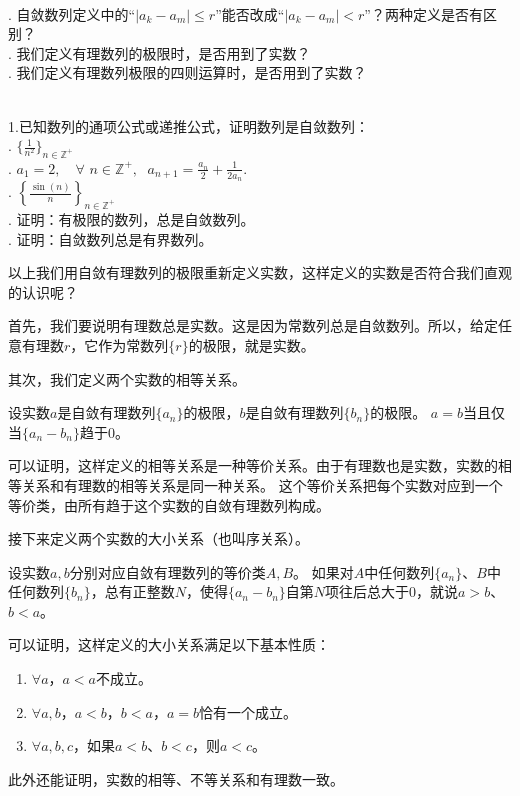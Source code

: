 \documentclass[12pt,UTF8]{ctexbook}
\begin{document}
\begin{sk}
    \mbox{}\\
    . 自敛数列定义中的“$|a_k -a_m| \leqslant r$”能否改成“$|a_k -a_m| < r$”？两种定义是否有区别？\\
    . 我们定义有理数列的极限时，是否用到了实数？\\
    . 我们定义有理数列极限的四则运算时，是否用到了实数？
\end{sk}
\begin{xt}
    \mbox{}\\
    \indent 1.已知数列的通项公式或递推公式，证明数列是自敛数列：\\
    . $\{\frac{1}{n^2}\}_{n\in\mathbb{Z}^+}$\\
    . $a_1 = 2, \quad \forall \,\, n\in\mathbb{Z}^+, \;\,\, a_{n+1} = \frac{a_n}{2} + \frac{1}{2a_n}.$\\
    . $\left\{\frac{\sin(n)}{n}\right\}_{n\in\mathbb{Z}^+}$ \\
    . 证明：有极限的数列，总是自敛数列。\\
    . 证明：自敛数列总是有界数列。
\end{xt}

以上我们用自敛有理数列的极限重新定义实数，这样定义的实数是否符合我们直观的认识呢？

首先，我们要说明有理数总是实数。这是因为常数列总是自敛数列。所以，给定任意有理数$r$，它作为常数列$\{r\}$的极限，就是实数。

其次，我们定义两个实数的相等关系。
\begin{df}
    设实数$a$是自敛有理数列$\{a_n\}$的极限，$b$是自敛有理数列$\{b_n\}$的极限。
    $a = b$当且仅当$\{a_n - b_n\}$趋于$0$。
\end{df}
可以证明，这样定义的相等关系是一种等价关系。由于有理数也是实数，实数的相等关系和有理数的相等关系是同一种关系。
这个等价关系把每个实数对应到一个等价类，由所有趋于这个实数的自敛有理数列构成。

接下来定义两个实数的大小关系（也叫序关系）。
\begin{df}
    设实数$a,b$分别对应自敛有理数列的等价类$A,B$。
    如果对$A$中任何数列$\{a_n\}$、$B$中任何数列$\{b_n\}$，总有正整数$N$，使得$\{a_n - b_n\}$自第$N$项往后总大于$0$，就说$a>b$、$b<a$。
\end{df}
可以证明，这样定义的大小关系满足以下基本性质：
\begin{enumerate}
    \item $\forall a$，$a < a$不成立。
    \item $\forall a, b$，$a < b$，$b <a$，$a = b$恰有一个成立。
    \item $\forall a, b, c$，如果$a < b$、$b < c$，则$a < c$。
\end{enumerate}
此外还能证明，实数的相等、不等关系和有理数一致。
\end{document}
